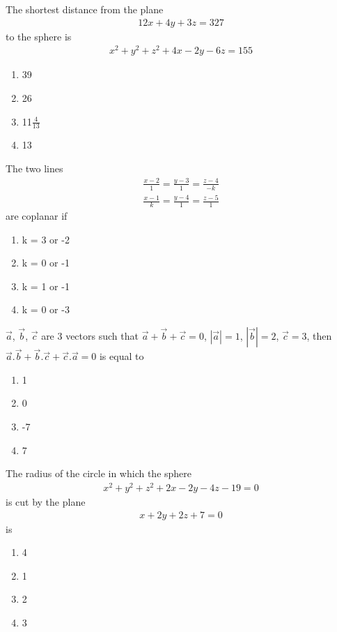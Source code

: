 \item The shortest distance from the plane 
\begin{align}
12x + 4y + 3z = 327
\end{align}
to the sphere is
\begin{align}
x^{2} + y^{2} + z^{2} + 4x - 2y - 6z = 155
\end{align}
\begin{enumerate}
\item 39
\item 26
\item 11$\frac{4}{13}$
\item 13
\end{enumerate}

\item The two lines 
\begin{align*}
\frac{x-2}{1} = \frac{y-3}{1} = \frac{z-4}{-k}
\end{align*}
\begin{align*}
\frac{x-1}{k} = \frac{y-4}{1} = \frac{z-5}{1}
\end{align*}
are coplanar if
\begin{enumerate}
\item k = 3 or -2
\item k = 0 or -1
\item k = 1 or -1
\item k = 0 or -3
\end{enumerate}

\item $\overrightarrow{a}$, $\overrightarrow{b}$, $\overrightarrow{c}$ are 3 vectors such that 
$\overrightarrow{a}+\overrightarrow{b}+\overrightarrow{c}=0$, $|\overrightarrow{a}|=1$, $|\overrightarrow{b}|=2$, $\overrightarrow{c}=3$, then $\overrightarrow{a}.\overrightarrow{b}+\overrightarrow{b}.\overrightarrow{c}+\overrightarrow{c}.\overrightarrow{a}=0$ is equal to
\begin{enumerate}
\item 1
\item 0
\item -7
\item 7
\end{enumerate}

\item The radius of the circle in which the sphere
\begin{align}
x^2+y^2+z^2+2x-2y-4z-19=0 
\end{align}
is cut by the plane
\begin{align}
x+2y+2z+7=0
\end{align}
is
\begin{enumerate}
\item 4
\item 1
\item 2
\item 3
\end{enumerate}

